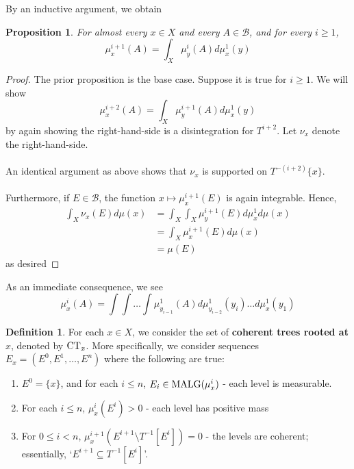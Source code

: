 \documentclass{article}
\newcommand{\malg}[1]{\textmd{MALG}(#1)}
\newcommand{\CT}{\textmd{CT}}
\newtheorem{proposition}[theorem]{Proposition}
\theoremstyle{definition}
\newtheorem{definition}[theorem]{Definition}
\begin{document}
\noindent By an inductive argument, we obtain
\begin{proposition}\label{coherencelemma}
    For almost every $ x\in X $ and every $ A\in \mathcal{B} $, and for every $ i\geq 1 $,
    \[
    \mu^{i+1}_x(A) = \int_X \mu^i_y(A)d\mu^1_x(y)
    \]
\end{proposition}
\begin{proof}
    The prior proposition is the base case. Suppose it is true for $ i\geq 1 $. We will show
    \[
    \mu^{i+2}_x(A) = \int_X \mu^{i+1}_y(A)d\mu^1_x(y)
    \]
    by again showing the right-hand-side is a disintegration for $ T^{i+2} $. Let $ \nu_x $ denote the right-hand-side. \\\\
    An identical argument as above shows that $\nu_x$ is supported on $ T^{-(i+2)}\{x\} $. \\\\
    Furthermore, if $ E\in \mathcal{B} $, the function $ x\mapsto \mu_x^{i+1}(E) $ is again integrable. Hence,
    \begin{align*}
        \int_X \nu_x(E) d\mu(x) &= \int_X \int_X \mu_y^{i+1}(E)d\mu_x^1 d\mu(x) \\
        &= \int_X \mu_x^{i+1}(E)d\mu(x)\\
        &= \mu(E)
    \end{align*}
    as desired
\end{proof}
\noindent As an immediate consequence, we see
\begin{equation}
    \mu^i_x(A) = \int \int \ldots \int \mu^1_{y_{i-1}}(A)d\mu^1_{y_{i-2}}(y_i)\ldots d\mu^1_{x}(y_1)
\end{equation}
\begin{definition}
    For each $ x\in X $, we consider the set of \textbf{coherent trees rooted at $ x $}, denoted by $ \CT_x $. More specifically, we consider sequences $ E_x = (E^0, E^1,\ldots, E^n) $ where the following are true:
\begin{enumerate}
    \item $ E^0 = \{x\} $, and for each $ i\leq n$, $ E_i \in \malg{\mu_x^i} $ - each level is measurable.
    \item For each $ i \leq n $, $ \mu_x^i(E^i) > 0 $ - each level has positive mass
    \item For $ 0\leq i < n $, $ \mu_x^{i+1}(E^{i+1}\setminus T^{-1}[E^i]) = 0 $ - the levels are coherent; essentially, `$ E^{i+1}\subseteq T^{-1}[E^i] $'.
\end{enumerate}
\end{definition}
\end{document}
